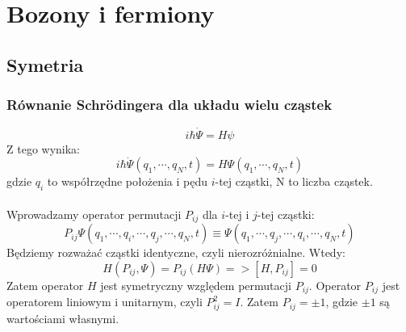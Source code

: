 \section{Bozony i fermiony}
\subsection{Symetria}
\subsubsection{Równanie Schrödingera dla układu wielu cząstek}
%
\begin{equation*}
    i \hbar \dot{\Psi} = H \psi
\end{equation*}
%
Z tego wynika: 
%
\begin{equation*}
    i \hbar \dot{\Psi}(q_1, \cdots, q_N, t) = H \Psi(q_1, \cdots, q_N, t)
\end{equation*}
%
gdzie $q_i$ to współrzędne położenia i pędu $i$-tej cząstki, N to liczba cząstek.
%
\\ \\
%
Wprowadzamy operator permutacji $P_{ij}$ dla $i$-tej i $j$-tej cząstki:
%
\begin{equation*}
    P_{ij} \Psi(q_1, \cdots, q_i, \cdots, q_j, \cdots, q_N, t) \equiv \Psi(q_1, \cdots, q_j, \cdots, q_i, \cdots, q_N, t)
\end{equation*}
%
Będziemy rozważać cząstki identyczne, czyli nierozróżnialne. Wtedy:
%
\begin{equation*}
    H(P_{ij}, \Psi) = P_{ij} (H \Psi) => [H, P_{ij}] = 0
\end{equation*}
%
Zatem operator $H$ jest symetryczny względem permutacji $P_{ij}$.
%
Operator $P_{ij}$ jest operatorem liniowym i unitarnym, czyli $P_{ij}^2 = I$. Zatem $P_{ij} = \pm 1$, gdzie $\pm 1$ są wartościami własnymi.
%
